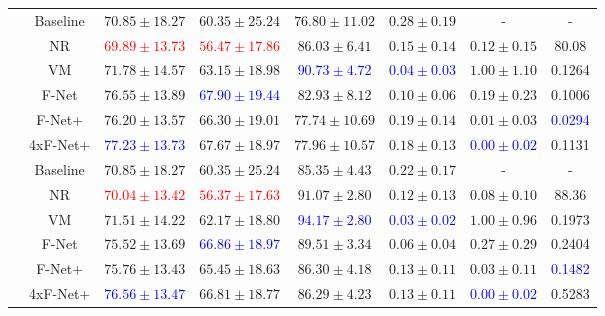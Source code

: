 \begin{table}[h]
{\begin{tabular}{c c c c c c c c}
		\midrule
		\multirow{6}{*}{\rotatebox{90}{$R=4$}} & Baseline & $70.85 \pm 18.27$ & $60.35 \pm 25.24$ & $76.80 \pm 11.02$ & $0.28 \pm 0.19$ & - & -\\  
		 & NR & \textcolor{red}{$69.89 \pm 13.73$} & \textcolor{red}{$56.47 \pm 17.86$} & $86.03 \pm 6.41$ & $0.15 \pm 0.14$ & $ 0.12 \pm 0.15$ & 80.08 \\  
		 & VM & $71.78 \pm 14.57$ & $63.15 \pm 18.98$ & \textcolor{blue}{$90.73 \pm 4.72$} & \textcolor{blue}{$0.04 \pm 0.03$} & $1.00 \pm 1.10$ & 0.1264\\  	
		 & F-Net & $76.55 \pm 13.89$ & \textcolor{blue}{$67.90 \pm 19.44$} & $82.93 \pm 8.12$ & $0.10 \pm 0.06$ & $0.19 \pm 0.23$ & 0.1006\\ 
		 & F-Net+ & $76.20 \pm 13.57$ & $66.30 \pm 19.01$ & $77.74 \pm 10.69$ & $0.19 \pm 0.14$ & $0.01 \pm 0.03$ & \textcolor{blue}{0.0294}\\ 
		 & 4xF-Net+ & \textcolor{blue}{$77.23 \pm 13.73$} & $67.67 \pm 18.97$ & $77.96 \pm 10.57$ & $0.18 \pm 0.13$ & \textcolor{blue}{$0.00 \pm 0.02$} & 0.1131\\   
		
		\midrule
		\multirow{6}{*}{\rotatebox{90}{$R=8$}} & Baseline & $70.85 \pm 18.27$ & $60.35 \pm 25.24$ & $85.35 \pm 4.43$ & $0.22 \pm 0.17$ & - & -\\  
		 & NR & \textcolor{red}{$70.04 \pm 13.42$} & \textcolor{red}{$56.37 \pm 17.63$} & $91.07 \pm 2.80$ & $0.12 \pm 0.13$ & $0.08 \pm 0.10$ & 88.36 \\
		 & VM & $71.51 \pm 14.22$ & $62.17 \pm 18.80$ & \textcolor{blue}{$94.17 \pm 2.80$} & \textcolor{blue}{$0.03 \pm 0.02$} & $1.00 \pm 0.96$ & 0.1973\\	
		 & F-Net & $75.52 \pm 13.69$ & \textcolor{blue}{$66.86 \pm 18.97$} & $89.51 \pm 3.34$ & $0.06 \pm 0.04$ & $0.27 \pm 0.29$ & 0.2404\\ 
		 & F-Net+ & $75.76 \pm 13.43$ & $65.45 \pm 18.63$ & $86.30 \pm 4.18$ & $0.13 \pm 0.11$ & $0.03 \pm 0.11$ & \textcolor{blue}{0.1482}\\ 
		 & 4xF-Net+ & \textcolor{blue}{$76.56 \pm 13.47$} & $66.81 \pm 18.77$ & $86.29 \pm 4.23$ & $0.13 \pm 0.11$ & \textcolor{blue}{$0.00 \pm 0.02$} & 0.5283\\ 
		 	 

\end{tabular}}
\end{table}
